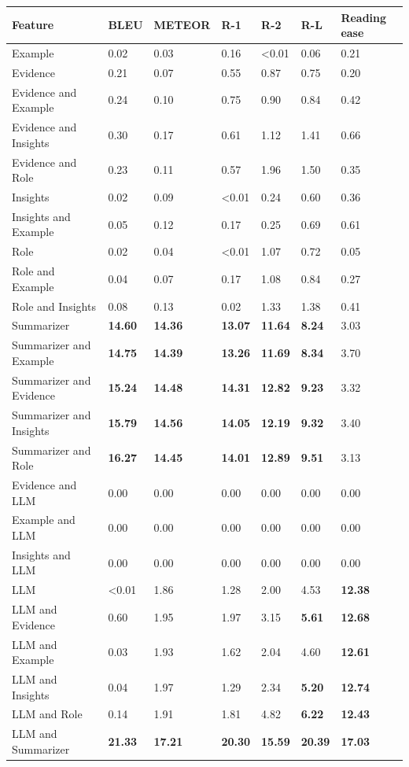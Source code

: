 \begin{tabular}{|l|l|l|l|l|l|l|}
\hline
\textbf{Feature} & BLEU & METEOR & R-1 & R-2 & R-L & Reading ease \\
 \hline
 Example & 0.02 & 0.03 & 0.16 & \textless{}0.01 & 0.06 & 0.21 \\
 \hline
 Evidence & 0.21 & 0.07 & 0.55 & 0.87 & 0.75 & 0.20 \\
 \hline
 Evidence and Example & 0.24 & 0.10 & 0.75 & 0.90 & 0.84 & 0.42 \\
 \hline
 Evidence and Insights & 0.30 & 0.17 & 0.61 & 1.12 & 1.41 & 0.66 \\
 \hline
 Evidence and Role & 0.23 & 0.11 & 0.57 & 1.96 & 1.50 & 0.35 \\
 \hline
 Insights & 0.02 & 0.09 & \textless{}0.01 & 0.24 & 0.60 & 0.36 \\
 \hline
 Insights and Example & 0.05 & 0.12 & 0.17 & 0.25 & 0.69 & 0.61 \\
 \hline
 Role & 0.02 & 0.04 & \textless{}0.01 & 1.07 & 0.72 & 0.05 \\
 \hline
 Role and Example & 0.04 & 0.07 & 0.17 & 1.08 & 0.84 & 0.27 \\
 \hline
 Role and Insights & 0.08 & 0.13 & 0.02 & 1.33 & 1.38 & 0.41 \\
 \hline
 Summarizer & \textbf{14.60} & \textbf{14.36} & \textbf{13.07} & \textbf{11.64} & \textbf{8.24} & 3.03 \\
 \hline
 Summarizer and Example & \textbf{14.75} & \textbf{14.39} & \textbf{13.26} & \textbf{11.69} & \textbf{8.34} & 3.70 \\
 \hline
 Summarizer and Evidence & \textbf{15.24} & \textbf{14.48} & \textbf{14.31} & \textbf{12.82} & \textbf{9.23} & 3.32 \\
 \hline
 Summarizer and Insights & \textbf{15.79} & \textbf{14.56} & \textbf{14.05} & \textbf{12.19} & \textbf{9.32} & 3.40 \\
 \hline
 Summarizer and Role & \textbf{16.27} & \textbf{14.45} & \textbf{14.01} & \textbf{12.89} & \textbf{9.51} & 3.13 \\
 \hline
 Evidence and LLM & 0.00 & 0.00 & 0.00 & 0.00 & 0.00 & 0.00 \\
 \hline
 Example and LLM & 0.00 & 0.00 & 0.00 & 0.00 & 0.00 & 0.00 \\
 \hline
 Insights and LLM & 0.00 & 0.00 & 0.00 & 0.00 & 0.00 & 0.00 \\
 \hline
 LLM & \textless{}0.01 & 1.86 & 1.28 & 2.00 & 4.53 & \textbf{12.38} \\
 \hline
 LLM and Evidence & 0.60 & 1.95 & 1.97 & 3.15 & \textbf{5.61} & \textbf{12.68} \\
 \hline
 LLM and Example & 0.03 & 1.93 & 1.62 & 2.04 & 4.60 & \textbf{12.61} \\
 \hline
 LLM and Insights & 0.04 & 1.97 & 1.29 & 2.34 & \textbf{5.20} & \textbf{12.74} \\
 \hline
 LLM and Role & 0.14 & 1.91 & 1.81 & 4.82 & \textbf{6.22} & \textbf{12.43} \\
 \hline
 LLM and Summarizer & \textbf{21.33} & \textbf{17.21} & \textbf{20.30} & \textbf{15.59} & \textbf{20.39} & \textbf{17.03} \\
\hline
\end{tabular}
